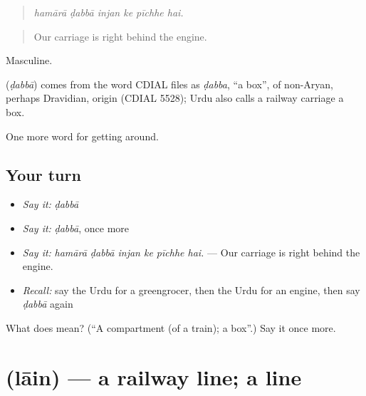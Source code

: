 \begin{quote}
     
\end{quote}

\begin{quote}
\emph{hamārā ḍabbā injan ke pīchhe hai.}
\end{quote}

\begin{quote}
Our carriage is right behind the engine.
\end{quote}

Masculine.

\begin{cousinweb}
\textbf{} (\emph{ḍabbā}) comes from the word CDIAL files as \emph{ḍabba}, \textquotedblleft{}a box\textquotedblright{}, of non-Aryan, perhaps Dravidian, origin (CDIAL 5528); Urdu also calls a railway carriage a box.
\end{cousinweb}

\begin{grammarlens}[title={What you've built}]
One more word for getting around.
\end{grammarlens}

\subsection*{Your turn}
\begin{itemize}
\raggedright
  \item \emph{Say it:} \emph{ḍabbā}
  \item \emph{Say it:} \emph{ḍabbā}, once more
  \item \emph{Say it:} \emph{hamārā ḍabbā injan ke pīchhe hai.} — Our carriage is right behind the engine.
  \item \emph{Recall:} say the Urdu for a greengrocer, then the Urdu for an engine, then say \emph{ḍabbā} again
\end{itemize}

\begin{tcolorbox}[breakable,colback=teal!4,colframe=teal!35!black,title={Before you move on}]
What does  mean? (\textquotedblleft{}A compartment (of a train); a box\textquotedblright{}.) Say it once more.
\end{tcolorbox}
\section[\texorpdfstring{\ur{لائن} (lāin)}{لائن (lāin)}]{ (lāin) — a railway line; a line}

